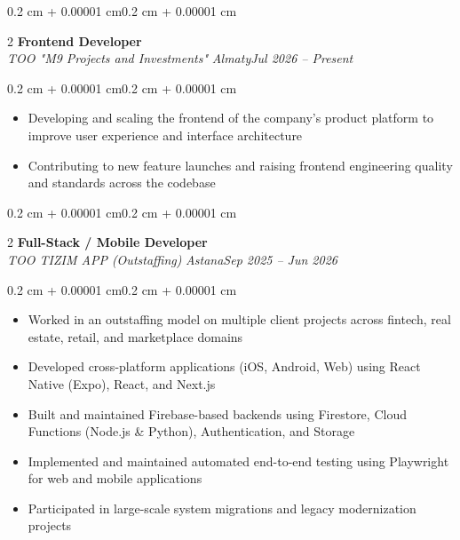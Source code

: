 \documentclass[10pt, letterpaper]{article}
\newenvironment{highlights}{\begin{itemize}[topsep=0.10 cm,parsep=0.10 cm,partopsep=0pt,itemsep=0pt,leftmargin=0.4 cm + 10pt]}{\end{itemize}}
\newenvironment{onecolentry}{\begin{adjustwidth}{0.2 cm + 0.00001 cm}{0.2 cm + 0.00001 cm}}{\end{adjustwidth}}
\newenvironment{twocolentry}[2][]{\onecolentry\def\secondColumn{#2}\setcolumnwidth{\fill, 4.5 cm}\begin{paracol}{2}}{\switchcolumn \raggedleft \secondColumn\end{paracol}\endonecolentry}
\begin{document}
\begin{twocolentry}{\textit{Almaty}\newline\textit{Jul 2026 – Present}}
\textbf{Frontend Developer}\\
\textit{TOO "M9 Projects and Investments"}
\end{twocolentry}
\vspace{0.10 cm}
\begin{onecolentry}
\begin{highlights}
    \item Developing and scaling the frontend of the company's product platform to improve user experience and interface architecture
    \item Contributing to new feature launches and raising frontend engineering quality and standards across the codebase
\end{highlights}
\end{onecolentry}

\vspace{0.2 cm}
\begin{twocolentry}{\textit{Astana}\newline\textit{Sep 2025 – Jun 2026}}
\textbf{Full-Stack / Mobile Developer}\\
\textit{TOO TIZIM APP (Outstaffing)}
\end{twocolentry}
\vspace{0.10 cm}
\begin{onecolentry}
\begin{highlights}
    \item Worked in an outstaffing model on multiple client projects across fintech, real estate, retail, and marketplace domains
    \item Developed cross-platform applications (iOS, Android, Web) using React Native (Expo), React, and Next.js
    \item Built and maintained Firebase-based backends using Firestore, Cloud Functions (Node.js \& Python), Authentication, and Storage
    \item Implemented and maintained automated end-to-end testing using Playwright for web and mobile applications
    \item Participated in large-scale system migrations and legacy modernization projects
\end{highlights}
\end{onecolentry}
\end{document}
